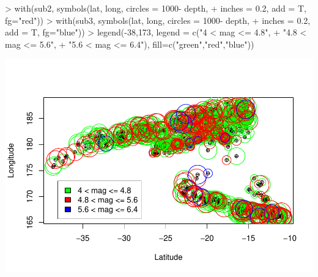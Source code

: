 \documentclass[
]{article}
\newenvironment{Shaded}{\begin{snugshade}}{\end{snugshade}}
\newcommand{\AttributeTok}[1]{\textcolor[rgb]{0.77,0.63,0.00}{#1}}
\newcommand{\DecValTok}[1]{\textcolor[rgb]{0.00,0.00,0.81}{#1}}
\newcommand{\FloatTok}[1]{\textcolor[rgb]{0.00,0.00,0.81}{#1}}
\newcommand{\FunctionTok}[1]{\textcolor[rgb]{0.00,0.00,0.00}{#1}}
\newcommand{\NormalTok}[1]{#1}
\newcommand{\SpecialCharTok}[1]{\textcolor[rgb]{0.00,0.00,0.00}{#1}}
\newcommand{\StringTok}[1]{\textcolor[rgb]{0.31,0.60,0.02}{#1}}
\begin{document}
\begin{Shaded}
\begin{Highlighting}[]
\SpecialCharTok{\textgreater{}} \FunctionTok{with}\NormalTok{(sub2, }\FunctionTok{symbols}\NormalTok{(lat, long, }\AttributeTok{circles =} \DecValTok{1000}\SpecialCharTok{{-}}\NormalTok{ depth,}
\SpecialCharTok{+}                    \AttributeTok{inches =} \FloatTok{0.2}\NormalTok{, }\AttributeTok{add =}\NormalTok{ T, }\AttributeTok{fg=}\StringTok{"red"}\NormalTok{))}
\SpecialCharTok{\textgreater{}} \FunctionTok{with}\NormalTok{(sub3, }\FunctionTok{symbols}\NormalTok{(lat, long, }\AttributeTok{circles =} \DecValTok{1000}\SpecialCharTok{{-}}\NormalTok{ depth,}
\SpecialCharTok{+}                    \AttributeTok{inches =} \FloatTok{0.2}\NormalTok{, }\AttributeTok{add =}\NormalTok{ T, }\AttributeTok{fg=}\StringTok{"blue"}\NormalTok{))}
\SpecialCharTok{\textgreater{}} \FunctionTok{legend}\NormalTok{(}\SpecialCharTok{{-}}\DecValTok{38}\NormalTok{,}\DecValTok{173}\NormalTok{, }\AttributeTok{legend =} \FunctionTok{c}\NormalTok{(}\StringTok{"4 \textless{} mag \textless{}= 4.8"}\NormalTok{, }
\SpecialCharTok{+}                        \StringTok{"4.8 \textless{} mag \textless{}= 5.6"}\NormalTok{,}
\SpecialCharTok{+}                        \StringTok{"5.6 \textless{} mag \textless{}= 6.4"}\NormalTok{), }\AttributeTok{fill=}\FunctionTok{c}\NormalTok{(}\StringTok{"green"}\NormalTok{,}\StringTok{"red"}\NormalTok{,}\StringTok{"blue"}\NormalTok{))}
\end{Highlighting}
\end{Shaded}

\includegraphics{HUDM6122-Homework_02-Chenguang-Pan_files/figure-latex/unnamed-chunk-10-1.pdf}
\end{document}
